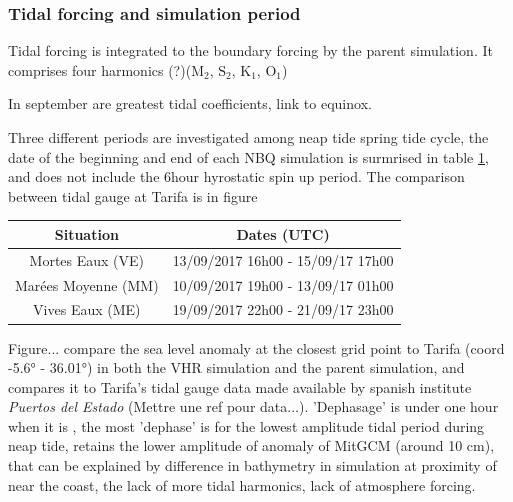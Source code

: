 \subsubsection{Tidal forcing and simulation period}
Tidal forcing is integrated to the boundary forcing by the parent simulation. It comprises four harmonics (?)($\text{M}_{\text{2}}$, $\text{S}_{\text{2}}$, $\text{K}_{\text{1}}$, $\text{O}_{\text{1}}$)

In september are greatest tidal coefficients, link to equinox.

Three different periods are investigated among neap tide spring tide cycle, the date of the beginning and end of each NBQ simulation is surmrised in table \ref{tab_dates_MIV}, and does not include the 6hour hyrostatic spin up period. The comparison between tidal gauge at Tarifa is in figure 

\begin{table}[h]
        \centering
        \begin{tabular}{|c|c|}
                \hline
                Situation & Dates (UTC)\\
                \hline
                Mortes Eaux (VE) & 13/09/2017 16h00 - 15/09/17 17h00 \\
                Marées Moyenne (MM) & 10/09/2017 19h00 - 13/09/17 01h00  \\
                Vives Eaux (ME) & 19/09/2017 22h00 - 21/09/17 23h00  \\
                \hline
        \end{tabular}
        \label{tab_dates_MIV}
\end{table}

Figure... compare the sea level anomaly at the closest grid point to Tarifa (coord -5.6° - 36.01°) in both the VHR simulation and the parent simulation, and compares it to Tarifa's tidal gauge data made available by spanish institute \textit{Puertos del Estado} (Mettre une ref pour data...). 'Dephasage' is under one hour when it is , the most 'dephase' is for the lowest amplitude tidal period during neap tide, retains the lower amplitude of anomaly of MitGCM (around 10 cm), that can be explained by difference in bathymetry in simulation at proximity of near the coast, the lack of more tidal harmonics, lack of atmosphere forcing.

